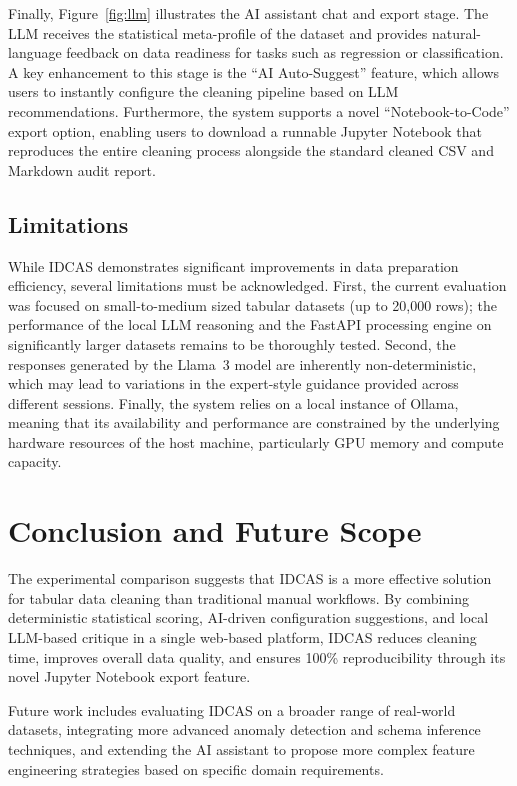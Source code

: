 \documentclass[conference]{IEEEtran}
\begin{document}
Finally, Figure~\ref{fig:llm} illustrates the AI assistant chat and export stage. The LLM receives the statistical meta-profile of the dataset and provides natural-language feedback on data readiness for tasks such as regression or classification. A key enhancement to this stage is the ``AI Auto-Suggest'' feature, which allows users to instantly configure the cleaning pipeline based on LLM recommendations. Furthermore, the system supports a novel ``Notebook-to-Code'' export option, enabling users to download a runnable Jupyter Notebook that reproduces the entire cleaning process alongside the standard cleaned CSV and Markdown audit report.

\subsection{Limitations}

While IDCAS demonstrates significant improvements in data preparation efficiency, several limitations must be acknowledged. First, the current evaluation was focused on small-to-medium sized tabular datasets (up to 20,000 rows); the performance of the local LLM reasoning and the FastAPI processing engine on significantly larger datasets remains to be thoroughly tested. Second, the responses generated by the Llama~3 model are inherently non-deterministic, which may lead to variations in the expert-style guidance provided across different sessions. Finally, the system relies on a local instance of Ollama, meaning that its availability and performance are constrained by the underlying hardware resources of the host machine, particularly GPU memory and compute capacity.

\section{Conclusion and Future Scope}

The experimental comparison suggests that IDCAS is a more effective solution for tabular data cleaning than traditional manual workflows. By combining deterministic statistical scoring, AI-driven configuration suggestions, and local LLM-based critique in a single web-based platform, IDCAS reduces cleaning time, improves overall data quality, and ensures 100\% reproducibility through its novel Jupyter Notebook export feature.

Future work includes evaluating IDCAS on a broader range of real-world datasets, integrating more advanced anomaly detection and schema inference techniques, and extending the AI assistant to propose more complex feature engineering strategies based on specific domain requirements.
\end{document}
